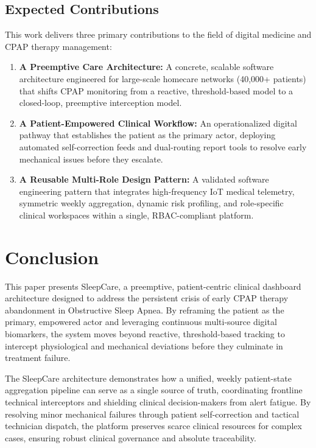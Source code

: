 \documentclass[conference]{IEEEtran}
\begin{document}
\subsection{Expected Contributions}
This work delivers three primary contributions to the field of digital medicine and CPAP therapy management:
\begin{enumerate}
\item \textbf{A Preemptive Care Architecture:} A concrete, scalable software architecture engineered for large-scale homecare networks (40,000+ patients) that shifts CPAP monitoring from a reactive, threshold-based model to a closed-loop, preemptive interception model.
\item \textbf{A Patient-Empowered Clinical Workflow:} An operationalized digital pathway that establishes the patient as the primary actor, deploying automated self-correction feeds and dual-routing report tools to resolve early mechanical issues before they escalate.
\item \textbf{A Reusable Multi-Role Design Pattern:} A validated software engineering pattern that integrates high-frequency IoT medical telemetry, symmetric weekly aggregation, dynamic risk profiling, and role-specific clinical workspaces within a single, RBAC-compliant platform.
\end{enumerate}

\section{Conclusion}

This paper presents SleepCare, a preemptive, patient-centric clinical dashboard architecture designed to address the persistent crisis of early CPAP therapy abandonment in Obstructive Sleep Apnea. By reframing the patient as the primary, empowered actor and leveraging continuous multi-source digital biomarkers, the system moves beyond reactive, threshold-based tracking to intercept physiological and mechanical deviations before they culminate in treatment failure.

The SleepCare architecture demonstrates how a unified, weekly patient-state aggregation pipeline can serve as a single source of truth, coordinating frontline technical interceptors and shielding clinical decision-makers from alert fatigue. By resolving minor mechanical failures through patient self-correction and tactical technician dispatch, the platform preserves scarce clinical resources for complex cases, ensuring robust clinical governance and absolute traceability.
\end{document}
